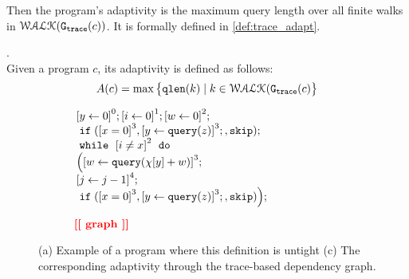 Then the program's adaptivity is the maximum query length over all finite walks in $\mathcal{WALK}(\mathtt{{G_{trace}}}({c}))$.
%
It is formally defined in \ref{def:trace_adapt}.
%
\begin{defn}
    .
    \label{def:trace_adapt}
    \\
    Given a program ${c}$, 
    its adaptivity is defined as follows:
    $$
    A(c) = \max \big 
    \{ \mathtt{qlen}(k) \mid k \in \mathcal{WALK}(\mathtt{{G_{trace}}}(c) \big \} 
    $$
    \end{defn}
%
{\footnotesize
\begin{figure}
 \centering
\quad
\begin{subfigure}{.4\textwidth}
\begin{centering}
$
    \begin{array}{l}
           \clabel{ \assign{y}{0}}^{0} ; 
            \clabel{\assign{i}{0} }^{1} ;             
            \clabel{\assign{w}{0} }^{2} ; \\
            \eif(\clabel{ x = 0}^{3}, \clabel{ \assign{y}{\query(z)}}^{3}; ,\eskip);\\
            \ewhile ~ \clabel{i \neq x}^{2} ~ \edo ~ \\
            \Big(
             \clabel{\assign{w}{\query(\chi[y]+w)} }^{3}  ; \\
             \clabel{\assign{j}{j-1}}^{4} ;\\
                        \eif(\clabel{ x = 0}^{3}, \clabel{ \assign{y}{\query(z)}}^{3}; ,\eskip)
     \Big);\\
        \end{array}
$
\caption{}
\end{centering}
\end{subfigure}
\begin{subfigure}{.5\textwidth}
\qquad
\begin{centering}
$\vcenter{\hbox{
\todo{graph}
}
}
$
\caption{}
\end{centering}
\end{subfigure}
\vspace{-0.4cm}
 \caption{(a) Example of a program where this definition is untight (c) The corresponding adaptivity through the trace-based dependency graph.}
\label{fig:simpl-two-round-graph}
\vspace{-0.5cm}
\end{figure}
}